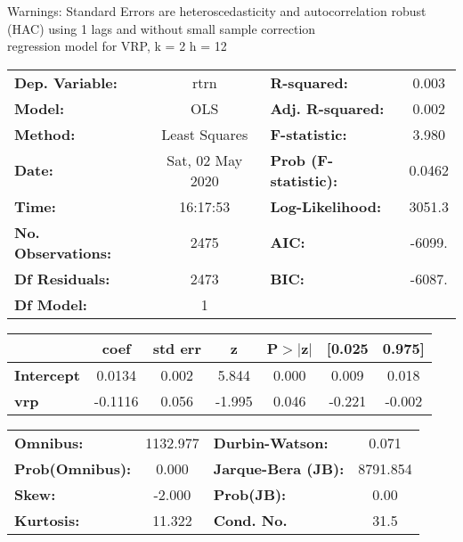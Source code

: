Warnings: \newline
 [1] Standard Errors are heteroscedasticity and autocorrelation robust (HAC) using 1 lags and without small sample correction\\ 

regression model for VRP, k = 2 h = 12\begin{center}
\begin{tabular}{lclc}
\toprule
\textbf{Dep. Variable:}    &       rtrn       & \textbf{  R-squared:         } &     0.003   \\
\textbf{Model:}            &       OLS        & \textbf{  Adj. R-squared:    } &     0.002   \\
\textbf{Method:}           &  Least Squares   & \textbf{  F-statistic:       } &     3.980   \\
\textbf{Date:}             & Sat, 02 May 2020 & \textbf{  Prob (F-statistic):} &   0.0462    \\
\textbf{Time:}             &     16:17:53     & \textbf{  Log-Likelihood:    } &    3051.3   \\
\textbf{No. Observations:} &        2475      & \textbf{  AIC:               } &    -6099.   \\
\textbf{Df Residuals:}     &        2473      & \textbf{  BIC:               } &    -6087.   \\
\textbf{Df Model:}         &           1      & \textbf{                     } &             \\
\bottomrule
\end{tabular}
\begin{tabular}{lcccccc}
                   & \textbf{coef} & \textbf{std err} & \textbf{z} & \textbf{P$> |$z$|$} & \textbf{[0.025} & \textbf{0.975]}  \\
\midrule
\textbf{Intercept} &       0.0134  &        0.002     &     5.844  &         0.000        &        0.009    &        0.018     \\
\textbf{vrp}       &      -0.1116  &        0.056     &    -1.995  &         0.046        &       -0.221    &       -0.002     \\
\bottomrule
\end{tabular}
\begin{tabular}{lclc}
\textbf{Omnibus:}       & 1132.977 & \textbf{  Durbin-Watson:     } &    0.071  \\
\textbf{Prob(Omnibus):} &   0.000  & \textbf{  Jarque-Bera (JB):  } & 8791.854  \\
\textbf{Skew:}          &  -2.000  & \textbf{  Prob(JB):          } &     0.00  \\
\textbf{Kurtosis:}      &  11.322  & \textbf{  Cond. No.          } &     31.5  \\
\bottomrule
\end{tabular}
\end{center}

